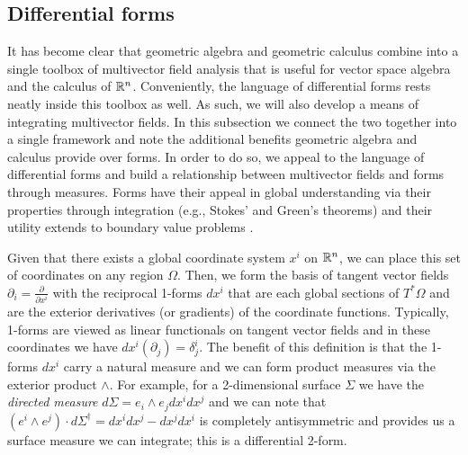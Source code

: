 \subsection{Differential forms}
\label{subsec:differential_forms}
It has become clear that geometric algebra and geometric calculus combine into a single toolbox of multivector field analysis that is useful for vector space algebra and the calculus of $\mathbb{R}^n$. Conveniently, the language of differential forms rests neatly inside this toolbox as well. As such, we will also develop a means of integrating multivector fields. In this subsection we connect the two together into a single framework and note the additional benefits geometric algebra and calculus provide over forms. In order to do so, we appeal to the language of differential forms and build a relationship between multivector fields and forms through measures. Forms have their appeal in global understanding via their properties through integration (e.g., Stokes' and Green's theorems) and their utility extends to boundary value problems \cite{schwarz_hodge_1995}.  

Given that there exists a global coordinate system $x^i$ on $\mathbb{R}^n$, we can place this set of coordinates on any region $\Omega$. Then, we form the basis of tangent vector fields $\partial_i = \frac{\partial}{\partial x^i}$ with the reciprocal 1-forms $dx^i$ that are each global sections of $T^*\Omega$ and are the exterior derivatives (or gradients) of the coordinate functions.  Typically, 1-forms are viewed as linear functionals on tangent vector fields and in these coordinates we have $dx^i  (\partial_j) = \delta^i_j$.  The benefit of this definition is that the 1-forms $dx^i$ carry a natural measure and we can form product measures via the exterior product $\wedge$.  For example, for a 2-dimensional surface $\Sigma$ we have the \emph{directed measure} $d\Sigma = e_i \wedge e_j dx^i dx^j$ and we can note that $(e^i \wedge e^j)\cdot d\Sigma^\dagger = dx^idx^j - dx^j dx^i$ is completely antisymmetric and provides us a surface measure we can integrate; this is a differential 2-form.

